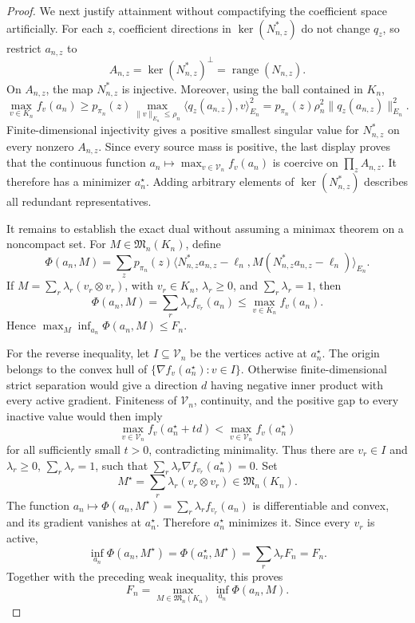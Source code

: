 \documentclass{article}
\begin{document}
\begin{proof}
We next justify attainment without compactifying the coefficient space artificially.  For each \(z\), coefficient directions in \(\ker(N_{n,z}^{\ast})\) do not change \(q_z\), so restrict \(a_{n,z}\) to
\[
 A_{n,z}=\ker(N_{n,z}^{\ast})^{\perp}=\operatorname{range}(N_{n,z}).
\]
On \(A_{n,z}\), the map \(N_{n,z}^{\ast}\) is injective.  Moreover, using the ball contained in \(K_n\),
\[
 \max_{v\in K_n}f_v(a_n)
 \ge p_{\pi_n}(z)\max_{\|v\|_{E_n}\le\rho_n}
          \langle q_z(a_{n,z}),v\rangle_{E_n}^{2}
 =p_{\pi_n}(z)\rho_n^2\|q_z(a_{n,z})\|_{E_n}^2.
\]
Finite-dimensional injectivity gives a positive smallest singular value for \(N_{n,z}^{\ast}\) on every nonzero \(A_{n,z}\).  Since every source mass is positive, the last display proves that the continuous function \(a_n\mapsto\max_{v\in\mathcal V_n}f_v(a_n)\) is coercive on \(\prod_zA_{n,z}\).  It therefore has a minimizer \(a_n^{\star}\).  Adding arbitrary elements of \(\ker(N_{n,z}^{\ast})\) describes all redundant representatives.

It remains to establish the exact dual without assuming a minimax theorem on a noncompact set.  For \(M\in\mathfrak M_n(K_n)\), define
\[
 \Phi(a_n,M)=\sum_zp_{\pi_n}(z)
 \langle N_{n,z}^{\ast}a_{n,z}-\ell_n,
 M(N_{n,z}^{\ast}a_{n,z}-\ell_n)\rangle_{E_n}.
\]
If \(M=\sum_r\lambda_r(v_r\otimes v_r)\), with \(v_r\in K_n\), \(\lambda_r\ge0\), and \(\sum_r\lambda_r=1\), then
\[
 \Phi(a_n,M)=\sum_r\lambda_rf_{v_r}(a_n)
 \le \max_{v\in K_n}f_v(a_n).
\]
Hence \(\max_M\inf_{a_n}\Phi(a_n,M)\le F_n\).

For the reverse inequality, let \(I\subseteq\mathcal V_n\) be the vertices active at \(a_n^{\star}\).  The origin belongs to the convex hull of \(\{\nabla f_v(a_n^{\star}):v\in I\}\).  Otherwise finite-dimensional strict separation would give a direction \(d\) having negative inner product with every active gradient.  Finiteness of \(\mathcal V_n\), continuity, and the positive gap to every inactive value would then imply
\[
 \max_{v\in\mathcal V_n}f_v(a_n^{\star}+td)
 <\max_{v\in\mathcal V_n}f_v(a_n^{\star})
\]
for all sufficiently small \(t>0\), contradicting minimality.  Thus there are \(v_r\in I\) and \(\lambda_r\ge0\), \(\sum_r\lambda_r=1\), such that \(\sum_r\lambda_r\nabla f_{v_r}(a_n^{\star})=0\).  Set
\[
 M^{\star}=\sum_r\lambda_r(v_r\otimes v_r)\in\mathfrak M_n(K_n).
\]
The function \(a_n\mapsto\Phi(a_n,M^{\star})=\sum_r\lambda_rf_{v_r}(a_n)\) is differentiable and convex, and its gradient vanishes at \(a_n^{\star}\).  Therefore \(a_n^{\star}\) minimizes it.  Since every \(v_r\) is active,
\[
 \inf_{a_n}\Phi(a_n,M^{\star})
 =\Phi(a_n^{\star},M^{\star})
 =\sum_r\lambda_rF_n=F_n.
\]
Together with the preceding weak inequality, this proves
\[
 F_n=\max_{M\in\mathfrak M_n(K_n)}\inf_{a_n}\Phi(a_n,M).
\]


\end{proof}
\end{document}
